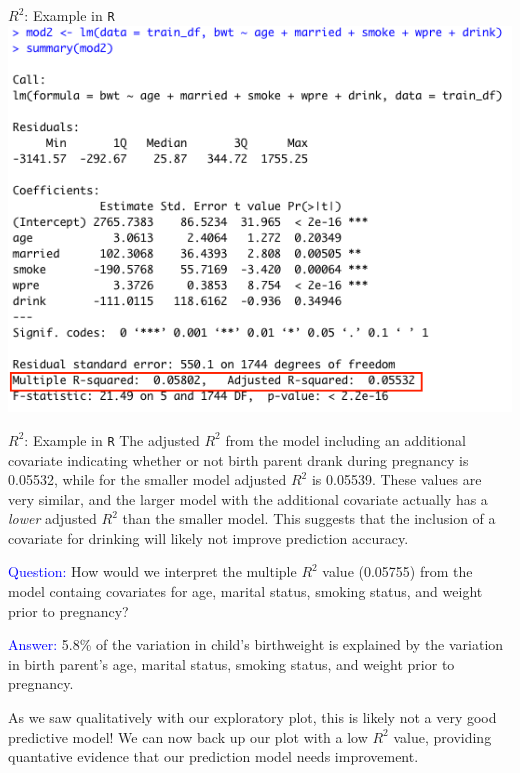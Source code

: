 \documentclass[10pt,t]{beamer}
\begin{document}
\begin{frame}{$R^2$: Example in \texttt{R}}
\centering \includegraphics[scale=0.4]{r2_example2.png}
\end{frame}


\begin{frame}{$R^2$: Example in \texttt{R}}
The adjusted $R^2$ from the model including an additional covariate indicating whether or not birth parent drank during pregnancy is 0.05532, while for the smaller model adjusted $R^2$ is 0.05539. These values are very similar, and the larger model with the additional covariate actually has a \textit{lower} adjusted $R^2$ than the smaller model. This suggests that the inclusion of a covariate for drinking will likely not improve prediction accuracy. \pause

\vspace{0.3cm}

\textcolor{blue}{Question:} How would we interpret the multiple $R^2$ value (0.05755) from the model containg covariates for age, marital status, smoking status, and weight prior to pregnancy? \pause

\vspace{0.3cm}

\textcolor{blue}{Answer:} 5.8\% of the variation in child's birthweight is explained by the variation in birth parent's age, marital status, smoking status, and weight prior to pregnancy. 

\vspace{0.3cm}

\small *As we saw qualitatively with our exploratory plot, this is likely not a very good predictive model! We can now back up our plot with a low $R^2$ value, providing quantative evidence that our prediction model needs improvement.
\end{frame}
\end{document}
